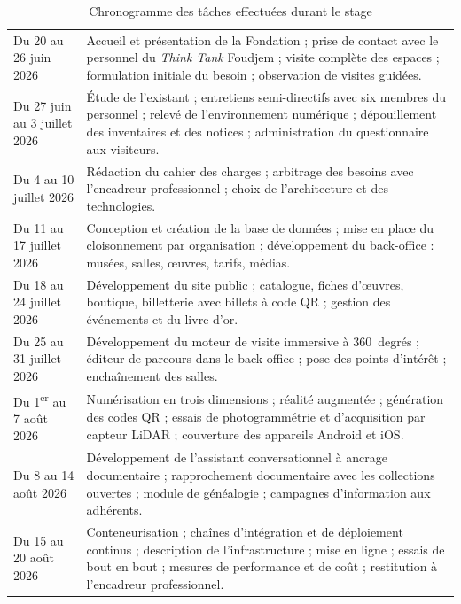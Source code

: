 \begin{table}[htbp]
\centering
\caption{Chronogramme des tâches effectuées durant le stage}
\label{tab:chronogramme}
\footnotesize
\begin{tabularx}{\textwidth}{|L{3.4cm}|X|}
\hline
{}
 &  \\ \hline
Du 20 au 26 juin 2026 &
Accueil et présentation de la Fondation ; prise de contact avec le personnel du
\emph{Think Tank} Foudjem ; visite complète des espaces ; formulation initiale
du besoin ; observation de visites guidées. \\ \hline
Du 27 juin au 3 juillet 2026 &
Étude de l'existant ; entretiens semi-directifs avec six membres du personnel ;
relevé de l'environnement numérique ; dépouillement des inventaires et des
notices ; administration du questionnaire aux visiteurs. \\ \hline
Du 4 au 10 juillet 2026 &
Rédaction du cahier des charges ; arbitrage des besoins avec l'encadreur
professionnel ;
choix de l'architecture et des technologies. \\ \hline
Du 11 au 17 juillet 2026 &
Conception et création de la base de données ; mise en place du cloisonnement
par organisation ; développement du back-office : musées, salles, œuvres,
tarifs, médias. \\ \hline
Du 18 au 24 juillet 2026 &
Développement du site public ; catalogue, fiches d'œuvres, boutique,
billetterie avec billets à code QR ; gestion des événements et du livre d'or. \\ \hline
Du 25 au 31 juillet 2026 &
Développement du moteur de visite immersive à 360~degrés ; éditeur de parcours
dans le back-office ; pose des points d'intérêt ; enchaînement des salles. \\ \hline
Du 1\textsuperscript{er} au 7 août 2026 &
Numérisation en trois dimensions ; réalité augmentée ; génération des codes QR ;
essais de photogrammétrie et d'acquisition par capteur LiDAR ; couverture des
appareils Android et iOS. \\ \hline
Du 8 au 14 août 2026 &
Développement de l'assistant conversationnel à ancrage documentaire ;
rapprochement documentaire avec les collections ouvertes ; module de généalogie ;
campagnes d'information aux adhérents. \\ \hline
Du 15 au 20 août 2026 &
Conteneurisation ; chaînes d'intégration et de déploiement continus ;
description de l'infrastructure ; mise en ligne ; essais de bout en bout ;
mesures de performance et de coût ; restitution à l'encadreur professionnel. \\ \hline
\end{tabularx}
\end{table}

